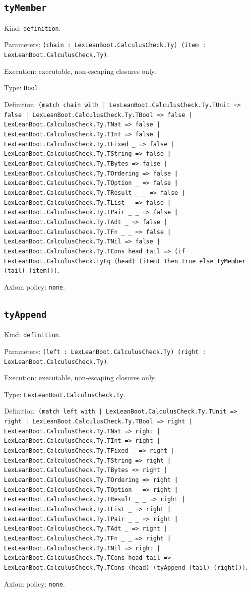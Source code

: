\documentclass[11pt]{article}
\begin{document}
\subsection*{\texttt{tyMember}}
\noindent Kind: \texttt{definition}.\par
\noindent Parameters: \texttt{(chain : LexLeanBoot.CalculusCheck.Ty) (item : LexLeanBoot.CalculusCheck.Ty)}.\par
\noindent Execution: executable, non-escaping closures only.\par
\noindent Type: \texttt{Bool}.\par
\noindent Definition: \texttt{(match chain with | LexLeanBoot.CalculusCheck.Ty.TUnit => false | LexLeanBoot.CalculusCheck.Ty.TBool => false | LexLeanBoot.CalculusCheck.Ty.TNat => false | LexLeanBoot.CalculusCheck.Ty.TInt => false | LexLeanBoot.CalculusCheck.Ty.TFixed \_ => false | LexLeanBoot.CalculusCheck.Ty.TString => false | LexLeanBoot.CalculusCheck.Ty.TBytes => false | LexLeanBoot.CalculusCheck.Ty.TOrdering => false | LexLeanBoot.CalculusCheck.Ty.TOption \_ => false | LexLeanBoot.CalculusCheck.Ty.TResult \_ \_ => false | LexLeanBoot.CalculusCheck.Ty.TList \_ => false | LexLeanBoot.CalculusCheck.Ty.TPair \_ \_ => false | LexLeanBoot.CalculusCheck.Ty.TAdt \_ => false | LexLeanBoot.CalculusCheck.Ty.TFn \_ \_ => false | LexLeanBoot.CalculusCheck.Ty.TNil => false | LexLeanBoot.CalculusCheck.Ty.TCons head tail => (if LexLeanBoot.CalculusCheck.tyEq (head) (item) then true else tyMember (tail) (item)))}.\par
\noindent Axiom policy: \texttt{none}.\par
\subsection*{\texttt{tyAppend}}
\noindent Kind: \texttt{definition}.\par
\noindent Parameters: \texttt{(left : LexLeanBoot.CalculusCheck.Ty) (right : LexLeanBoot.CalculusCheck.Ty)}.\par
\noindent Execution: executable, non-escaping closures only.\par
\noindent Type: \texttt{LexLeanBoot.CalculusCheck.Ty}.\par
\noindent Definition: \texttt{(match left with | LexLeanBoot.CalculusCheck.Ty.TUnit => right | LexLeanBoot.CalculusCheck.Ty.TBool => right | LexLeanBoot.CalculusCheck.Ty.TNat => right | LexLeanBoot.CalculusCheck.Ty.TInt => right | LexLeanBoot.CalculusCheck.Ty.TFixed \_ => right | LexLeanBoot.CalculusCheck.Ty.TString => right | LexLeanBoot.CalculusCheck.Ty.TBytes => right | LexLeanBoot.CalculusCheck.Ty.TOrdering => right | LexLeanBoot.CalculusCheck.Ty.TOption \_ => right | LexLeanBoot.CalculusCheck.Ty.TResult \_ \_ => right | LexLeanBoot.CalculusCheck.Ty.TList \_ => right | LexLeanBoot.CalculusCheck.Ty.TPair \_ \_ => right | LexLeanBoot.CalculusCheck.Ty.TAdt \_ => right | LexLeanBoot.CalculusCheck.Ty.TFn \_ \_ => right | LexLeanBoot.CalculusCheck.Ty.TNil => right | LexLeanBoot.CalculusCheck.Ty.TCons head tail => LexLeanBoot.CalculusCheck.Ty.TCons (head) (tyAppend (tail) (right)))}.\par
\noindent Axiom policy: \texttt{none}.\par
\end{document}
